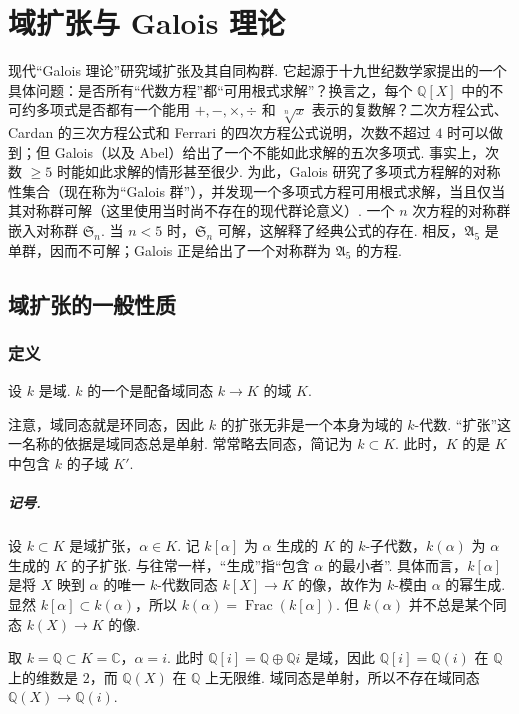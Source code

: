 \chapter{域扩张与 Galois 理论}\label{chap:galois-2}
现代``Galois 理论''研究域扩张及其自同构群. 它起源于十九世纪数学家提出的一个具体问题：是否所有``代数方程''都``可用根式求解''？换言之，每个 $\mathbb Q[X]$ 中的不可约多项式是否都有一个能用 $+,-,\times,\div$ 和 $\sqrt[n]{x}$ 表示的复数解？二次方程公式、Cardan 的三次方程公式和 Ferrari 的四次方程公式说明，次数不超过 $4$ 时可以做到；但 Galois（以及 Abel）给出了一个不能如此求解的五次多项式. 事实上，次数 $\ge5$ 时能如此求解的情形甚至很少. 为此，Galois 研究了多项式方程解的对称性集合（现在称为``Galois 群''），并发现一个多项式方程可用根式求解，当且仅当其对称群可解（这里使用当时尚不存在的现代群论意义）. 一个 $n$ 次方程的对称群嵌入对称群 $\mathfrak S_n$. 当 $n<5$ 时，$\mathfrak S_n$ 可解，这解释了经典公式的存在. 相反，$\mathfrak A_5$ 是单群，因而不可解；Galois 正是给出了一个对称群为 $\mathfrak A_5$ 的方程.
\section{域扩张的一般性质}\label{sec:galois-2-1}
\subsection{定义}\label{sec:galois-2-1-1}
\begin{definition*}
设 $k$ 是域. $k$ 的一个是配备域同态 $k\longrightarrow K$ 的域 $K$.
\end{definition*}
注意，域同态就是环同态，因此 $k$ 的扩张无非是一个本身为域的 $k$-代数. ``扩张''这一名称的依据是域同态总是单射. 常常略去同态，简记为 $k\subset K$. 此时，$K$ 的是 $K$ 中包含 $k$ 的子域 $K'$.
\paragraph{记号.} 设 $k\subset K$ 是域扩张，$\alpha\in K$. 记 $k[\alpha]$ 为 $\alpha$ 生成的 $K$ 的 $k$-子代数，$k(\alpha)$ 为 $\alpha$ 生成的 $K$ 的子扩张.
与往常一样，``生成''指``包含 $\alpha$ 的最小者''. 具体而言，$k[\alpha]$ 是将 $X$ 映到 $\alpha$ 的唯一 $k$-代数同态 $k[X]\longrightarrow K$ 的像，故作为 $k$-模由 $\alpha$ 的幂生成. 显然 $k[\alpha]\subset k(\alpha)$，所以 $k(\alpha)=\operatorname{Frac}(k[\alpha])$. 但 $k(\alpha)$ 并不总是某个同态 $k(X)\longrightarrow K$ 的像.
\begin{example*}
取 $k=\mathbb Q\subset K=\mathbb C$，$\alpha=i$. 此时 $\mathbb Q[i]=\mathbb Q\oplus\mathbb Qi$ 是域，因此 $\mathbb Q[i]=\mathbb Q(i)$ 在 $\mathbb Q$ 上的维数是 $2$，而 $\mathbb Q(X)$ 在 $\mathbb Q$ 上无限维. 域同态是单射，所以不存在域同态 $\mathbb Q(X)\longrightarrow\mathbb Q(i)$.
\end{example*}
